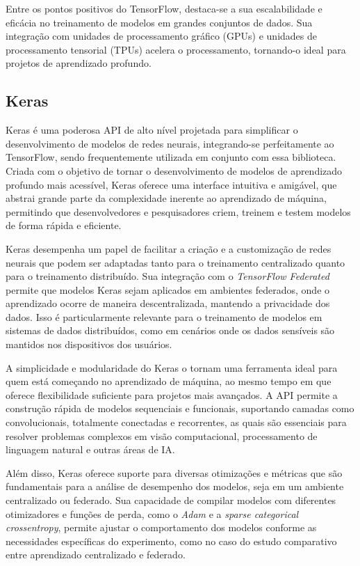 Entre os pontos positivos do TensorFlow, destaca-se a sua escalabilidade e eficácia no treinamento de modelos em grandes conjuntos de dados. Sua integração com unidades de processamento gráfico (GPUs) e unidades de processamento tensorial (TPUs) acelera o processamento, tornando-o ideal para projetos de aprendizado profundo.

\subsection{Keras}

Keras é uma poderosa API de alto nível projetada para simplificar o desenvolvimento de modelos de redes neurais, integrando-se perfeitamente ao TensorFlow, sendo frequentemente utilizada em conjunto com essa biblioteca. Criada com o objetivo de tornar o desenvolvimento de modelos de aprendizado profundo mais acessível, Keras oferece uma interface intuitiva e amigável, que abstrai grande parte da complexidade inerente ao aprendizado de máquina, permitindo que desenvolvedores e pesquisadores criem, treinem e testem modelos de forma rápida e eficiente.

Keras desempenha um papel de facilitar a criação e a customização de redes neurais que podem ser adaptadas tanto para o treinamento centralizado quanto para o treinamento distribuído. Sua integração com o \textit{TensorFlow Federated} permite que modelos Keras sejam aplicados em ambientes federados, onde o aprendizado ocorre de maneira descentralizada, mantendo a privacidade dos dados. Isso é particularmente relevante para o treinamento de modelos em sistemas de dados distribuídos, como em cenários onde os dados sensíveis são mantidos nos dispositivos dos usuários.

A simplicidade e modularidade do Keras o tornam uma ferramenta ideal para quem está começando no aprendizado de máquina, ao mesmo tempo em que oferece flexibilidade suficiente para projetos mais avançados. A API permite a construção rápida de modelos sequenciais e funcionais, suportando camadas como convolucionais, totalmente conectadas e recorrentes, as quais são essenciais para resolver problemas complexos em visão computacional, processamento de linguagem natural e outras áreas de IA.

Além disso, Keras oferece suporte para diversas otimizações e métricas que são fundamentais para a análise de desempenho dos modelos, seja em um ambiente centralizado ou federado. Sua capacidade de compilar modelos com diferentes otimizadores e funções de perda, como o \textit{Adam} e a \textit{sparse categorical crossentropy}, permite ajustar o comportamento dos modelos conforme as necessidades específicas do experimento, como no caso do estudo comparativo entre aprendizado centralizado e federado.

